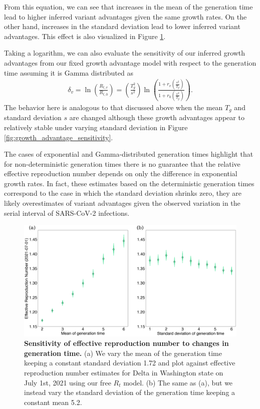 \documentclass[11pt,oneside,letterpaper]{article}
\begin{document}
From this equation, we can see that increases in the mean of the generation time lead to higher inferred variant advantages given the same growth rates.
On the other hand, increases in the standard deviation lead to lower inferred variant advantages. This effect is also visualized in Figure \ref{fig:generation_time_sensitivity}.

Taking a logarithm, we can also evaluate the sensitivity of our inferred growth advantages from our fixed growth advantage model with respect to the generation time assuming it is Gamma distributed as
\begin{align*}
 \delta_{v}  = \ln \left( \frac{R_{t,v}}{R_{t,0}} \right) = \left( \frac{T_{g}^{2}}{s^{2}} \right)  \ln \left( \frac{1 + r_{v}  \left(\frac{s^{2}}{T_{g}}\right)}{1 + r_{0} \left(\frac{s^{2}}{T_{g}}\right) } \right).
\end{align*}
The behavior here is analogous to that discussed above when the mean $T_{g}$ and standard deviation $s$ are changed although these growth advantages appear to relatively stable under varying standard deviation in Figure \ref{fig:growth_advantage_sensitivity}.

The cases of exponential and Gamma-distributed generation times highlight that for non-deterministic generation times there is no guarantee that the relative effective reproduction number depends on only the difference in exponential growth rates.
In fact, these estimates based on the deterministic generation times correspond to the case in which the standard deviation shrinks zero, they are likely overestimates of variant advantages given the observed variation in the serial interval of SARS-CoV-2 infections.

\begin{figure}
  \centering
  \includegraphics[width=\linewidth]{figs/generation_time_sensitivity.png}
  \caption{\textbf{Sensitivity of effective reproduction number to changes in generation time.} 
(a) We vary the mean of the generation time keeping a constant standard deviation 1.72 and plot against effective reproduction number estimates for Delta in Washington state on July 1st, 2021 using our free $R_{t}$ model.
(b) The same as (a), but we instead vary the standard deviation of the generation time keeping a constant mean 5.2.}%
  \label{fig:generation_time_sensitivity}
\end{figure}
\end{document}
